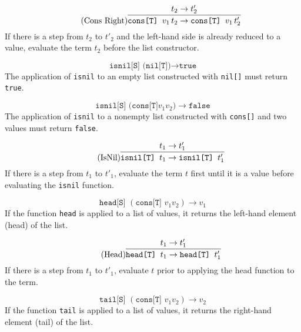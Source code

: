 \begin{equation*}
    \tag{Cons Right}
    \infer{
        \texttt{cons[T] } v_1\,t_2 \rightarrow \texttt{cons[T] } v_1\,t'_2
    }{
        t_2 \rightarrow t'_2
    }
\end{equation*}
If there is a step from $t_2$ to $t'_2$ and the left-hand side
is already reduced to a value, evaluate the term $t_2$
before the list constructor.

\begin{equation*}
    \tag{IsNil of Nil}
    \texttt{isnil[S] (nil[T])} \rightarrow \texttt{true}
\end{equation*}
The application of \texttt{isnil} to an empty list constructed
with \texttt{nil[]} must return \texttt{true}.

\begin{equation*}
    \tag{IsNil of Nil}
    \texttt{isnil[S] (cons[T]} v_1 v_2 \texttt{)} \rightarrow \texttt{false}
\end{equation*}
The application of \texttt{isnil} to a nonempty list constructed
with \texttt{cons[]} and two values must return \texttt{false}.

\begin{equation*}
    \tag{IsNil}
    \infer{
        \texttt{isnil[T] } t_1 \rightarrow \texttt{isnil[T] } t'_1
    }{
        t_1 \rightarrow t'_1
    }
\end{equation*}
If there is a step from $t_1$ to $t'_1$, evaluate the term $t$ first
until it is a value before evaluating the \texttt{isnil} function.

\begin{equation*}
    \tag{Head of cons}
    \texttt{head[S] } (\texttt{cons[T] } v_1 v_2) \rightarrow v_1
\end{equation*}
If the function \texttt{head} is applied to a list of values,
it returns the left-hand element (head) of the list.

\begin{equation*}
    \tag{Head}
    \infer{
        \texttt{head[T] } t_1 \rightarrow \texttt{head[T] } t'_1
    }{
        t_1 \rightarrow t'_1
    }
\end{equation*}
If there is a step from $t_1$ to $t'_1$, evaluate $t$ prior to applying
the head function to the term.

\begin{equation*}
    \tag{Tail of cons}
    \texttt{tail[S] } (\texttt{cons[T] } v_1 v_2) \rightarrow v_2
\end{equation*}
If the function \texttt{tail} is applied to a list of values,
it returns the right-hand element (tail) of the list.

